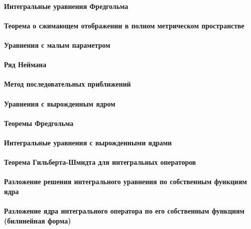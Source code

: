 \documentclass[russian,twocolumn]{article}
\begin{document}
\paragraph{Интегральные уравнения Фредгольма}

\paragraph{Теорема о сжимающем отображении в полном метрическом пространстве}

\paragraph{Уравнения с малым параметром}

\paragraph{Ряд Неймана}

\paragraph{Метод последовательных приближений}

\paragraph{Уравнения с вырожденным ядром}

\paragraph{Теоремы Фредгольма}

\paragraph{Интегральные уравнения с вырожденными ядрами}

\paragraph{Теорема Гильберта-Шмидта для интегральных операторов}

\paragraph{Разложение решения интегрального уравнения по собственным функциям ядра}

\paragraph{Разложение ядра интегрального оператора по его собственным функциям (билинейная форма)}
\end{document}
